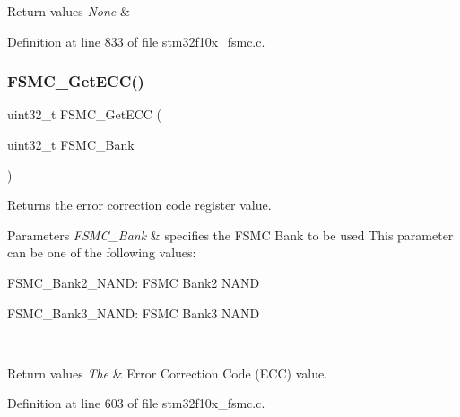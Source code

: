 \begin{DoxyRetVals}{Return values}
{\em None} & \\
\hline
\end{DoxyRetVals}


Definition at line 833 of file stm32f10x\+\_\+fsmc.\+c.

\mbox{\label{group___f_s_m_c___exported___functions_gaad6d4f5b5a41684ce053fea55bdb98d8}} 
\subsubsection{\texorpdfstring{F\+S\+M\+C\+\_\+\+Get\+E\+C\+C()}{FSMC\_GetECC()}}
{\footnotesize\ttfamily uint32\+\_\+t F\+S\+M\+C\+\_\+\+Get\+E\+CC (\begin{DoxyParamCaption}\item[{uint32\+\_\+t}]{F\+S\+M\+C\+\_\+\+Bank }\end{DoxyParamCaption})}



Returns the error correction code register value. 


\begin{DoxyParams}{Parameters}
{\em F\+S\+M\+C\+\_\+\+Bank} & specifies the F\+S\+MC Bank to be used This parameter can be one of the following values\+: \begin{DoxyItemize}
\item F\+S\+M\+C\+\_\+\+Bank2\+\_\+\+N\+A\+ND\+: F\+S\+MC Bank2 N\+A\+ND \item F\+S\+M\+C\+\_\+\+Bank3\+\_\+\+N\+A\+ND\+: F\+S\+MC Bank3 N\+A\+ND \end{DoxyItemize}
\\
\hline
\end{DoxyParams}

\begin{DoxyRetVals}{Return values}
{\em The} & Error Correction Code (E\+CC) value. \\
\hline
\end{DoxyRetVals}


Definition at line 603 of file stm32f10x\+\_\+fsmc.\+c.

\mbox{\label{group___f_s_m_c___exported___functions_gae00355115b078f483f0771057bb849c4}} 
